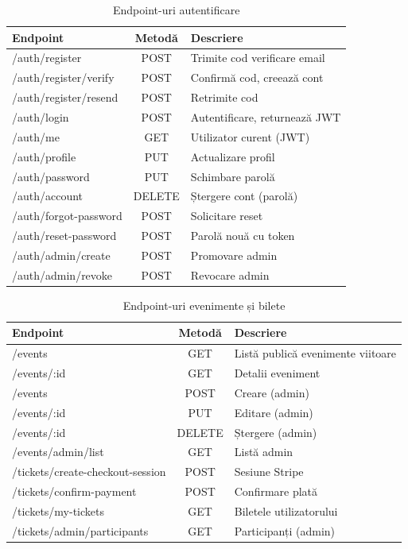 \begin{table}[htbp]
	\centering
	\begin{tabular}{|>{\ttfamily}p{5.5cm}|c|l|}
		\hline
		\textbf{Endpoint} & \textbf{Metodă} & \textbf{Descriere} \\ \hline
		/auth/register & POST & Trimite cod verificare email \\ \hline
		/auth/register/verify & POST & Confirmă cod, creează cont \\ \hline
		/auth/register/resend & POST & Retrimite cod \\ \hline
		/auth/login & POST & Autentificare, returnează JWT \\ \hline
		/auth/me & GET & Utilizator curent (JWT) \\ \hline
		/auth/profile & PUT & Actualizare profil \\ \hline
		/auth/password & PUT & Schimbare parolă \\ \hline
		/auth/account & DELETE & Ștergere cont (parolă) \\ \hline
		/auth/forgot-password & POST & Solicitare reset \\ \hline
		/auth/reset-password & POST & Parolă nouă cu token \\ \hline
		/auth/admin/create & POST & Promovare admin \\ \hline
		/auth/admin/revoke & POST & Revocare admin \\ \hline
	\end{tabular}
	\caption{Endpoint-uri autentificare}
	\label{tab:endpoints_auth}
\end{table}

\begin{table}[htbp]
	\centering
	\begin{tabular}{|>{\ttfamily}p{8cm}|c|l|}
		\hline
		\textbf{Endpoint} & \textbf{Metodă} & \textbf{Descriere} \\ \hline
		/events & GET & Listă publică evenimente viitoare \\ \hline
		/events/:id & GET & Detalii eveniment \\ \hline
		/events & POST & Creare (admin) \\ \hline
		/events/:id & PUT & Editare (admin) \\ \hline
		/events/:id & DELETE & Ștergere (admin) \\ \hline
		/events/admin/list & GET & Listă admin \\ \hline
		/tickets/create-checkout-session & POST & Sesiune Stripe \\ \hline
		/tickets/confirm-payment & POST & Confirmare plată \\ \hline
		/tickets/my-tickets & GET & Biletele utilizatorului \\ \hline
		/tickets/admin/participants & GET & Participanți (admin) \\ \hline
	\end{tabular}
	\caption{Endpoint-uri evenimente și bilete}
	\label{tab:endpoints_evenimente_bilete}
\end{table}

